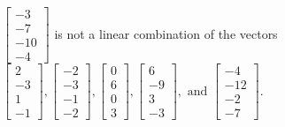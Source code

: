 \begin{exercise}
\begin{exerciseStatement}
  \end{exerciseStatement}
  \begin{exerciseAnswer}
   \(\left[\begin{array}{c}
-3 \\
-7 \\
-10 \\
-4
\end{array}\right]\) 
  	 is not  
	a linear combination of the vectors \(\left[\begin{array}{c}
2 \\
-3 \\
1 \\
-1
\end{array}\right] , \left[\begin{array}{c}
-2 \\
-3 \\
-1 \\
-2
\end{array}\right] , \left[\begin{array}{c}
0 \\
6 \\
0 \\
3
\end{array}\right] , \left[\begin{array}{c}
6 \\
-9 \\
3 \\
-3
\end{array}\right] , \text{ and } \left[\begin{array}{c}
-4 \\
-12 \\
-2 \\
-7
\end{array}\right]\).

	
  


  \end{exerciseAnswer}
\end{exercise}